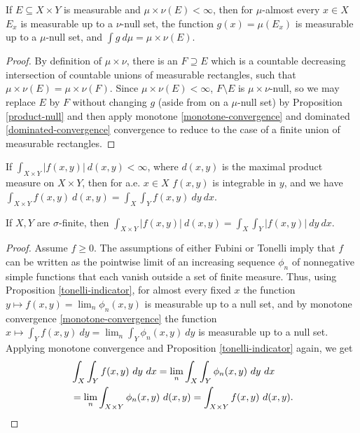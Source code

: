 \begin{prop}\label{tonelli-indicator} If $E \subseteq X\times Y$ is measurable and $\mu\times\nu(E) < \infty$, then for $\mu$-almost every $x \in X$ $E_x$ is measurable up to a $\nu$-null set, the function $g(x) = \mu(E_x)$ is measurable up to a $\mu$-null set, and $\int g\ d\mu = \mu\times\nu(E)$.
\end{prop}
\begin{proof} By definition of $\mu\times\nu$, there is an $F \supseteq E$ which is a countable decreasing intersection of countable unions of measurable rectangles, such that $\mu\times\nu(E) = \mu\times\nu(F)$. Since $\mu\times\nu(E) < \infty$, $F\setminus E$ is $\mu\times\nu$-null, so we may replace $E$ by $F$ without changing $g$ (aside from on a $\mu$-null set) by Proposition \ref{product-null} and then apply monotone \ref{monotone-convergence} and dominated \ref{dominated-convergence} convergence to reduce to the case of a finite union of measurable rectangles.
\end{proof}

\begin{thm}\label{fubini} If $\int_{X\times Y} |f(x,y)|\ d(x,y) < \infty$, where $d(x,y)$ is the maximal product measure on $X\times Y$, then for a.e. $x\in X$ $f(x,y)$ is integrable in $y$, and we have $\int_{X\times Y} f(x,y)\ d(x,y) = \int_X \int_Y f(x,y)\ dy\ dx$.
\end{thm}

\begin{thm}\label{tonelli} If $X,Y$ are $\sigma$-finite, then $\int_{X\times Y} |f(x,y)|\ d(x,y) = \int_X \int_Y |f(x,y)|\ dy\ dx$.
\end{thm}
\begin{proof} Assume $f \ge 0$. The assumptions of either Fubini or Tonelli imply that $f$ can be written as the pointwise limit of an increasing sequence $\phi_n$ of nonnegative simple functions that each vanish outside a set of finite measure. Thus, using Proposition \ref{tonelli-indicator}, for almost every fixed $x$ the function $y\mapsto f(x,y) = \lim_n \phi_n(x,y)$ is measurable up to a null set, and by monotone convergence \ref{monotone-convergence} the function $x \mapsto \int_Y f(x,y)\ dy = \lim_n \int_Y \phi_n(x,y)\ dy$ is measurable up to a null set. Applying monotone convergence and Proposition \ref{tonelli-indicator} again, we get
\begin{align*}
&\int_X\int_Yf(x,y)\ dy\ dx = \lim_n \int_X\int_Y\phi_n(x,y)\ dy\ dx\\
&= \lim_n \int_{X\times Y}\phi_n(x,y)\ d(x,y) = \int_{X\times Y}f(x,y)\ d(x,y).\qedhere
\end{align*}
\end{proof}

